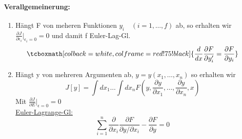 \documentclass[titlepage,12pt,a4paper,ngerman]{report}
\newcommand{\rmbox}[1]{\tcboxmath[colback=white,colframe=red!75!black]{#1}} %
\begin{document}
\paragraph{Verallgemeinerung:}
\begin{enumerate}[(1)]
	\item Hängt F von meheren Funktionen $ y_i \quad (i=1,\dots ,f) $ ab, so erhalten wir $ \frac{\partial J}{\partial \epsilon_i} \big|_{\epsilon_i = 0} = 0 $ und damit f Euler-Lag-Gl.
	$$\rmbox{\frac{d}{dx} \frac{\partial F}{\partial y'_i} = \frac{\partial F}{\partial y_i}}$$
	\item Hängt y von mehreren Argumenten ab, $ y = y(x_1,\dots,x_n) $ so erhalten wir
	$$ J[y] = \int dx_1 \dots \int dx_n F(y,\frac{\partial y}{\partial x_1} , \dots , \frac{\partial y}{\partial x_n} , x) $$
	Mit $ \frac{\partial J}{\partial E} \bigg| _{\epsilon = 0} = 0 $\\
	\underline{Euler-Lagrange-Gl:}
	$$\sum_{i=1}^{n} \frac{\partial }{\partial x_i} \frac{\partial F}{\partial y / \partial x_i} - \frac{\partial F}{\partial y} = 0$$
\end{enumerate}
\end{document}

